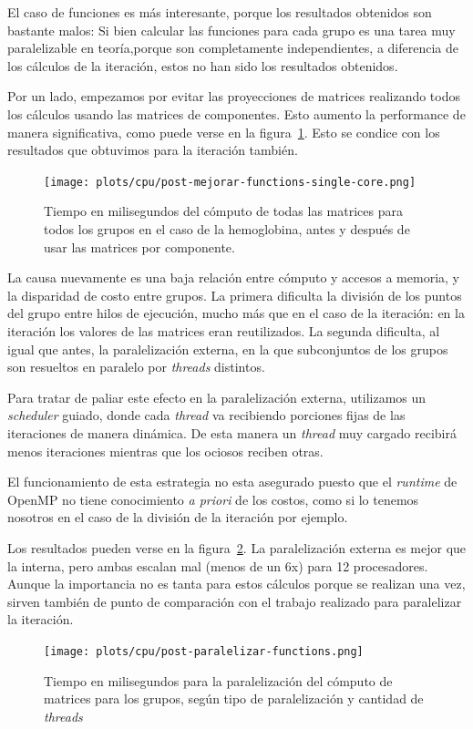 El caso de funciones es m\'as interesante, porque los resultados obtenidos son
bastante malos: Si bien calcular las funciones para cada grupo es una tarea muy
paralelizable en teor\'ia,porque son completamente independientes, a diferencia de
los c\'alculos de la iteraci\'on, estos no han sido los resultados obtenidos.

Por un lado, empezamos por evitar las proyecciones de matrices realizando todos
los c\'alculos usando las matrices de componentes. Esto aumento la performance de
manera significativa, como puede verse en la figura~\ref{fig:lio-post-elim-proy}.
Esto se condice con los resultados que obtuvimos para la iteraci\'on tambi\'en.

\begin{figure}[htbp]
   \centering
   \texttt{[image: plots/cpu/post-mejorar-functions-single-core.png]}
   \caption{Tiempo en milisegundos del c\'omputo de todas las matrices para todos
   los grupos en el caso de la hemoglobina, antes y despu\'es de usar las matrices por
   componente.}
   \label{fig:lio-post-elim-proy}
\end{figure}

La causa nuevamente es una baja relaci\'on entre c\'omputo y accesos a memoria,
y la disparidad de costo entre grupos. La primera dificulta la divisi\'on de los
puntos del grupo entre hilos de ejecuci\'on, mucho m\'as que en el caso de la iteraci\'on: en la iteraci\'on los
valores de las matrices eran reutilizados. La segunda dificulta, al igual que antes, la
paralelizaci\'on externa, en la que subconjuntos de los grupos son resueltos
en paralelo por \textit{threads} distintos.

Para tratar de paliar este efecto en la paralelizaci\'on externa, utilizamos un
\textit{scheduler} guiado, donde cada \textit{thread} va recibiendo porciones
fijas de las iteraciones de manera din\'amica. De esta manera un \textit{thread}
muy cargado recibir\'a menos iteraciones mientras que los ociosos reciben otras.

El funcionamiento de esta estrategia no esta asegurado puesto que el \textit{runtime}
de OpenMP no tiene conocimiento \textit{a priori} de los costos, como si lo tenemos
nosotros en el caso de la divisi\'on de la iteraci\'on por ejemplo.

Los resultados pueden verse en la figura~\ref{fig:functions-paralelizado}. La
paralelizaci\'on externa es mejor que la interna, pero ambas escalan mal (menos
de un 6x) para 12 procesadores. Aunque la importancia no es tanta para estos
c\'alculos porque se realizan una vez, sirven tambi\'en de punto de comparaci\'on
con el trabajo realizado para paralelizar la iteraci\'on.

\begin{figure}[htbp]
   \centering
   \texttt{[image: plots/cpu/post-paralelizar-functions.png]}
   \caption{Tiempo en milisegundos para la paralelizaci\'on del c\'omputo
   de matrices para los grupos, seg\'un tipo de paralelizaci\'on y cantidad de
   \textit{threads}}
   \label{fig:functions-paralelizado}
\end{figure}
